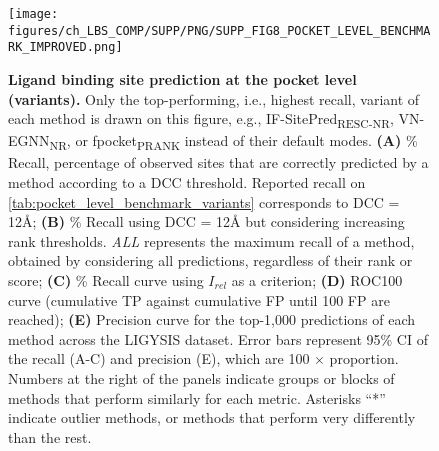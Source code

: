 \begin{figure}[ht!]
    \centering
    \texttt{[image: figures/ch\_LBS\_COMP/SUPP/PNG/SUPP\_FIG8\_POCKET\_LEVEL\_BENCHMARK\_IMPROVED.png]}
    \caption[Ligand binding site prediction at the pocket level (variants)]{\textbf{Ligand binding site prediction at the pocket level (variants).} Only the top-performing, i.e., highest recall, variant of each method is drawn on this figure, e.g., IF-SitePred\textsubscript{RESC-NR}, VN-EGNN\textsubscript{NR}, or fpocket\textsubscript{PRANK} instead of their default modes. \textbf{(A)} \% Recall, percentage of observed sites that are correctly predicted by a method according to a DCC threshold. Reported recall on \autoref{tab:pocket_level_benchmark_variants} corresponds to DCC = 12\AA{}; \textbf{(B)} \% Recall using DCC = 12\AA{} but considering increasing rank thresholds. \textit{ALL} represents the maximum recall of a method, obtained by considering all predictions, regardless of their rank or score; \textbf{(C)} \% Recall curve using $I_{rel}$ as a criterion; \textbf{(D)} ROC100 curve (cumulative TP against cumulative FP until 100 FP are reached); \textbf{(E)} Precision curve for the top-1,000 predictions of each method across the LIGYSIS dataset. Error bars represent 95\% CI of the recall (A-C) and precision (E), which are 100 $\times$ proportion. Numbers at the right of the panels indicate groups or blocks of methods that perform similarly for each metric. Asterisks ``*'' indicate outlier methods, or methods that perform very differently than the rest.}
    \label{fig:pocket_level_benchmark_variants}
\end{figure}


